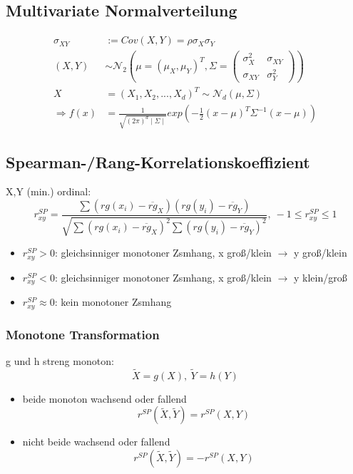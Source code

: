 \documentclass[10pt,a4paper,landscape]{article}
\begin{document}
\begin{multicols}{4}
\subsection{Multivariate Normalverteilung}
\begin{align*}
\sigma_{XY} &:=Cov(X,Y)=\rho\sigma_X\sigma_Y \\
(X,Y) &\sim \mathcal{N}_2\left(\mu = (\mu_X, \mu_Y)^T, \Sigma= \begin{pmatrix}
\sigma_X^2 & \sigma_{XY} \\
\sigma_{XY} & \sigma_Y^2
\end{pmatrix}\right) \\
X &= (X_1, X_2, ..., X_d)^T \sim \mathcal{N}_d(\mu, \Sigma) \\
\Rightarrow f(x)&=\frac{1}{\sqrt{(2\pi)^d\mid \Sigma \mid}}exp\left(-\frac{1}{2}(x-\mu)^T\Sigma^{-1}(x-\mu) \right)
\end{align*}

\subsection{Spearman-/Rang-Korrelationskoeffizient}
X,Y (min.) ordinal:
\[
r_{xy}^{SP}=\frac{\sum(rg(x_i)-\overline{rg}_X)(rg(y_i)-\overline{rg}_Y)}{\sqrt{\sum(rg(x_i)-\overline{rg}_X)^2\sum(rg(y_i)-\overline{rg}_Y)^2}},~ -1 \leq r_{xy}^{SP} \leq 1
\]

\begin{itemize}
\item $r_{xy}^{SP} > 0$: gleichsinniger monotoner Zsmhang, x groß/klein $\rightarrow$ y groß/klein
\item $r_{xy}^{SP} < 0$: gleichsinniger monotoner Zsmhang, x groß/klein $\rightarrow$ y klein/groß
\item $r_{xy}^{SP} \approx 0$: kein monotoner Zsmhang
\end{itemize}

\subsubsection*{Monotone Transformation}
g und h streng monoton:
\[
\tilde{X}=g(X), ~ \tilde{Y}=h(Y)
\]

\begin{itemize}
\item beide monoton wachsend oder fallend
\[
r^{SP}(\tilde{X}, \tilde{Y})=r^{SP}(X,Y)
\]
\item nicht beide wachsend oder fallend
\[
r^{SP}(\tilde{X}, \tilde{Y})=-r^{SP}(X,Y)
\]
\end{itemize}


\end{multicols}
\end{document}

